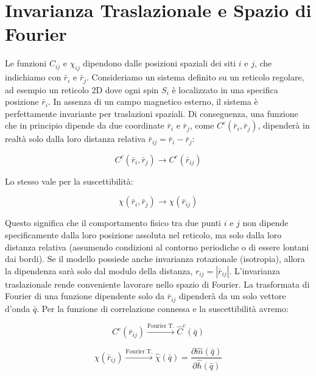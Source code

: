 \section{Invarianza Traslazionale e Spazio di Fourier}
Le funzioni $C_{ij}$ e $\chi_{ij}$ dipendono dalle posizioni spaziali dei siti $i$ e $j$, che indichiamo con $\bar{r}_i$ e $\bar{r}_j$.
Consideriamo un sistema definito su un reticolo regolare, ad esempio un reticolo 2D dove ogni spin $S_i$ è localizzato in una specifica posizione $\bar{r}_i$.
In assenza di un campo magnetico esterno, il sistema è perfettamente invariante per traslazioni spaziali. Di conseguenza, una funzione che in principio dipende da due coordinate $\bar{r}_i$ e $\bar{r}_j$, come $C^c(\bar{r}_i, \bar{r}_j)$, dipenderà in realtà solo dalla loro distanza relativa $\bar{r}_{ij} = \bar{r}_i - \bar{r}_j$:

\begin{equation} \label{eq:ch19_4}
C^c(\bar{r}_i, \bar{r}_j) \rightarrow C^c(\bar{r}_{ij})
\end{equation}

Lo stesso vale per la suscettibilità:

\begin{equation} \label{eq:ch19_5}
\chi(\bar{r}_i, \bar{r}_j) \rightarrow \chi(\bar{r}_{ij})
\end{equation}

Questo significa che il comportamento fisico tra due punti $i$ e $j$ non dipende specificamente dalla loro posizione assoluta nel reticolo, ma solo dalla loro distanza relativa (assumendo condizioni al contorno periodiche o di essere lontani dai bordi).
Se il modello possiede anche invarianza rotazionale (isotropia), allora la dipendenza sarà solo dal modulo della distanza, $r_{ij} = |\bar{r}_{ij}|$.
L'invarianza traslazionale rende conveniente lavorare nello spazio di Fourier. La trasformata di Fourier di una funzione dipendente solo da $\bar{r}_{ij}$ dipenderà da un solo vettore d'onda $\bar{q}$.
Per la funzione di correlazione connessa e la suscettibilità avremo:

\begin{equation} \label{eq:ch19_6}
C^c(\bar{r}_{ij}) \xrightarrow{\text{Fourier T.}} \hat{C}^c(\bar{q})
\end{equation}

\begin{equation} \label{eq:ch19_7}
\chi(\bar{r}_{ij}) \xrightarrow{\text{Fourier T.}} \hat{\chi}(\bar{q}) = \frac{\partial \hat{m}(\bar{q})}{\partial \hat{h}(\bar{q})}
\end{equation}


